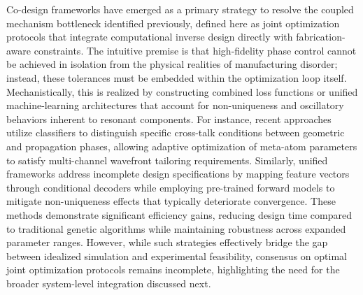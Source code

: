 \documentclass[11pt]{article}
\begin{document}
Co-design frameworks have emerged as a primary strategy to resolve the coupled mechanism bottleneck identified previously, defined here as joint optimization protocols that integrate computational inverse design directly with fabrication-aware constraints. The intuitive premise is that high-fidelity phase control cannot be achieved in isolation from the physical realities of manufacturing disorder; instead, these tolerances must be embedded within the optimization loop itself. Mechanistically, this is realized by constructing combined loss functions or unified machine-learning architectures that account for non-uniqueness and oscillatory behaviors inherent to resonant components. For instance, recent approaches utilize classifiers to distinguish specific cross-talk conditions between geometric and propagation phases, allowing adaptive optimization of meta-atom parameters to satisfy multi-channel wavefront tailoring requirements. Similarly, unified frameworks address incomplete design specifications by mapping feature vectors through conditional decoders while employing pre-trained forward models to mitigate non-uniqueness effects that typically deteriorate convergence. These methods demonstrate significant efficiency gains, reducing design time compared to traditional genetic algorithms while maintaining robustness across expanded parameter ranges. However, while such strategies effectively bridge the gap between idealized simulation and experimental feasibility, consensus on optimal joint optimization protocols remains incomplete, highlighting the need for the broader system-level integration discussed next. \citep{doi_10_1117_1_apn_2_1_016010_57069347} \citep{doi_10_1515_nanoph_2020_0379_1cc596ab} \citep{doi_10_23919_piers_fall62445_2025_11394631_4fdb8517}
\end{document}
